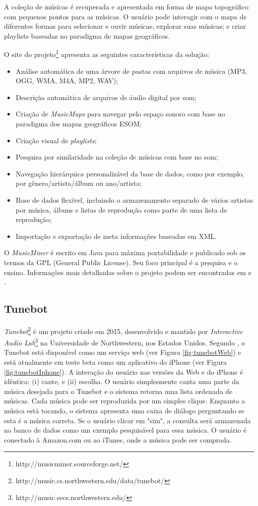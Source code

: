 A coleção de músicas é recuperada e apresentada em forma de mapa topográfico com pequenos pontos para as músicas. O usuário pode interagir com o mapa de diferentes formas para selecionar e ouvir músicas; explorar suas músicas; e criar playlists baseadas no paradigma de mapas geográficos.

O site do projeto\footnote{http://musicminer.sourceforge.net/}  apresenta as seguintes características da solução:

\begin{itemize}
    \item Análise automática de uma árvore de pastas com arquivos de música (MP3, OGG, WMA, M4A, MP2, WAV);
    \item Descrição automática de arquivos de áudio digital por som;
    \item Criação de \textit{MusicMaps} para navegar pelo espaço sonoro com base no paradigma dos mapas geográficos ESOM;
    \item Criação visual de \textit{playlists};
    \item Pesquisa por similaridade na coleção de músicas com base no som;
    \item Navegação hierárquica personalizável da base de dados, como por exemplo, por gênero/artista/álbum ou ano/artista;
    \item Base de dados flexível, incluindo o armazenamento separado de vários artistas por música, álbuns e listas de reprodução como parte de uma lista de reprodução;
    \item Importação e exportação de meta informações baseadas em XML.
\end{itemize}

O \textit{MusicMiner} é escrito em Java para máxima portabilidade e publicado sob os termos da GPL (General Public License). Seu foco principal é a pesquisa e o ensino. Informações mais detalhadas sobre o projeto podem ser encontradas em \cite{morchen2005} e \cite{musicminer}.

\subsection{Tunebot} \label{subsec:tunebot}
\textit{Tunebot}\footnote{http://music.cs.northwestern.edu/data/tunebot/} é um projeto criado em 2015, desenvolvido e mantido por \textit{Interactive Audio Lab}\footnote{http://music.eecs.northwestern.edu/} na Universidade de Northwestern, nos Estados Unidos. Segundo , o Tunebot está disponível como um serviço web (ver Figura \ref{fig:tunebotWeb}) e está atualmente em teste beta como um aplicativo do iPhone (ver Figura \ref{fig:tunebotIphone}). A interação do usuário nas versões da Web e do iPhone é idêntica:
(i) cante, e (ii) escolha. O usuário simplesmente canta uma parte da música desejada para o Tunebot e o sistema retorna uma lista ordenada de músicas. Cada música pode ser reproduzida por um simples clique. Enquanto a música está tocando, o sistema apresenta uma caixa de diálogo perguntando se esta é a música correta. Se o usuário clicar em "sim", a consulta será armazenada no banco de dados como um exemplo pesquisável para essa música. O usuário é conectado à Amazon.com ou ao iTunes, onde a música pode ser comprada.


